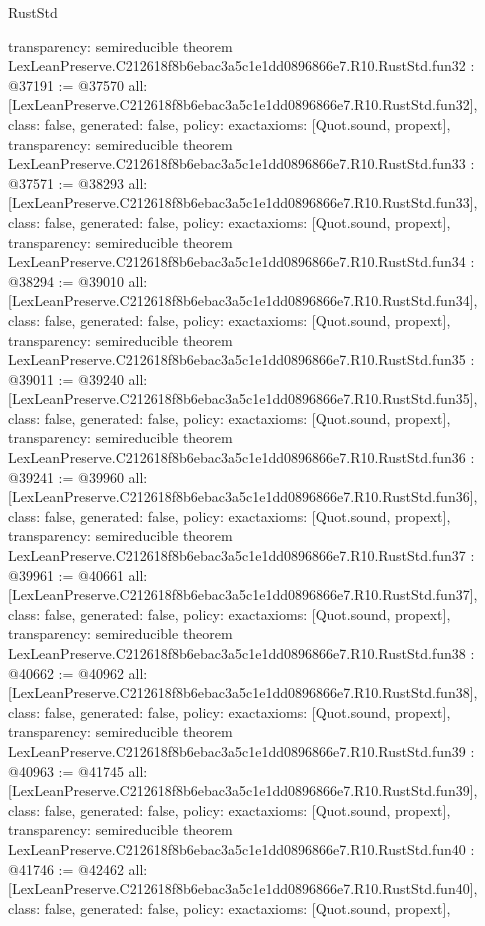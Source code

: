 \begin{lexlean}{RustStd}
\begin{coremodule}
{  transparency: semireducible
}
theorem LexLeanPreserve.C212618f8b6ebac3a5c1e1dd0896866e7.R10.RustStd.fun32 : @37191 := @37570 {
  all: [LexLeanPreserve.C212618f8b6ebac3a5c1e1dd0896866e7.R10.RustStd.fun32],
  class: false,
  generated: false,
  policy: exact{axioms: [Quot.sound, propext]},
  transparency: semireducible
}
theorem LexLeanPreserve.C212618f8b6ebac3a5c1e1dd0896866e7.R10.RustStd.fun33 : @37571 := @38293 {
  all: [LexLeanPreserve.C212618f8b6ebac3a5c1e1dd0896866e7.R10.RustStd.fun33],
  class: false,
  generated: false,
  policy: exact{axioms: [Quot.sound, propext]},
  transparency: semireducible
}
theorem LexLeanPreserve.C212618f8b6ebac3a5c1e1dd0896866e7.R10.RustStd.fun34 : @38294 := @39010 {
  all: [LexLeanPreserve.C212618f8b6ebac3a5c1e1dd0896866e7.R10.RustStd.fun34],
  class: false,
  generated: false,
  policy: exact{axioms: [Quot.sound, propext]},
  transparency: semireducible
}
theorem LexLeanPreserve.C212618f8b6ebac3a5c1e1dd0896866e7.R10.RustStd.fun35 : @39011 := @39240 {
  all: [LexLeanPreserve.C212618f8b6ebac3a5c1e1dd0896866e7.R10.RustStd.fun35],
  class: false,
  generated: false,
  policy: exact{axioms: [Quot.sound, propext]},
  transparency: semireducible
}
theorem LexLeanPreserve.C212618f8b6ebac3a5c1e1dd0896866e7.R10.RustStd.fun36 : @39241 := @39960 {
  all: [LexLeanPreserve.C212618f8b6ebac3a5c1e1dd0896866e7.R10.RustStd.fun36],
  class: false,
  generated: false,
  policy: exact{axioms: [Quot.sound, propext]},
  transparency: semireducible
}
theorem LexLeanPreserve.C212618f8b6ebac3a5c1e1dd0896866e7.R10.RustStd.fun37 : @39961 := @40661 {
  all: [LexLeanPreserve.C212618f8b6ebac3a5c1e1dd0896866e7.R10.RustStd.fun37],
  class: false,
  generated: false,
  policy: exact{axioms: [Quot.sound, propext]},
  transparency: semireducible
}
theorem LexLeanPreserve.C212618f8b6ebac3a5c1e1dd0896866e7.R10.RustStd.fun38 : @40662 := @40962 {
  all: [LexLeanPreserve.C212618f8b6ebac3a5c1e1dd0896866e7.R10.RustStd.fun38],
  class: false,
  generated: false,
  policy: exact{axioms: [Quot.sound, propext]},
  transparency: semireducible
}
theorem LexLeanPreserve.C212618f8b6ebac3a5c1e1dd0896866e7.R10.RustStd.fun39 : @40963 := @41745 {
  all: [LexLeanPreserve.C212618f8b6ebac3a5c1e1dd0896866e7.R10.RustStd.fun39],
  class: false,
  generated: false,
  policy: exact{axioms: [Quot.sound, propext]},
  transparency: semireducible
}
theorem LexLeanPreserve.C212618f8b6ebac3a5c1e1dd0896866e7.R10.RustStd.fun40 : @41746 := @42462 {
  all: [LexLeanPreserve.C212618f8b6ebac3a5c1e1dd0896866e7.R10.RustStd.fun40],
  class: false,
  generated: false,
  policy: exact{axioms: [Quot.sound, propext]},
}
\end{coremodule}
\end{lexlean}
